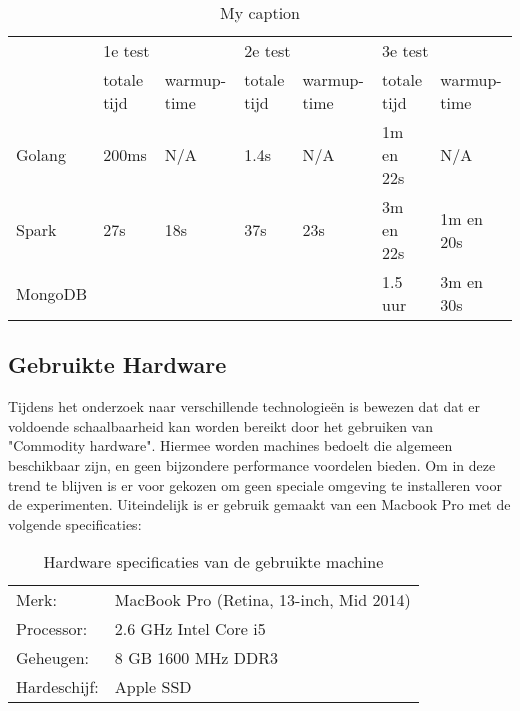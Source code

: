 \begin{table}[]
\centering
\caption{My caption}
\label{my-label}
\begin{tabular}{|l|l|l|l|l|l|l|}
\hline
\multirow{2}{*}{} & \multicolumn{2}{l|}{1e test} & \multicolumn{2}{l|}{2e test} & \multicolumn{2}{l|}{3e test} \\ \cline{2-7} 
                  & totale tijd   & warmup-time  & totale tijd   & warmup-time  & totale tijd   & warmup-time  \\ \hline
Golang            & 200ms         & N/A          & 1.4s          & N/A          & 1m en 22s     & N/A          \\ \hline
Spark          & 27s           & 18s          & 37s           & 23s          & 3m en 22s     & 1m en 20s    \\ \hline
MongoDB           &               &              &               &              & 1.5 uur       & 3m en 30s    \\ \hline
\end{tabular}
\end{table}
\clearpage

\subsection{Gebruikte Hardware}
\label{subsec:hardware_specs}

Tijdens het onderzoek naar verschillende technologieën is bewezen dat dat er voldoende schaalbaarheid kan worden bereikt door het gebruiken van "Commodity hardware". Hiermee worden machines bedoelt die algemeen beschikbaar zijn, en geen bijzondere performance voordelen bieden. Om in deze trend te blijven is er voor gekozen om geen speciale omgeving te installeren voor de experimenten. Uiteindelijk is er gebruik gemaakt van een Macbook Pro met de volgende specificaties:

\begin{table}[h]
\caption{Hardware specificaties van de gebruikte machine}
\label{tab:hardware_specs}
\begin{tabular}{ll}
Merk:      & MacBook Pro (Retina, 13-inch, Mid 2014) \\
Processor: & 2.6 GHz Intel Core i5                   \\
Geheugen:  & 8 GB 1600 MHz DDR3                      \\
Hardeschijf:   & Apple SSD                                  
\end{tabular}
\end{table}

